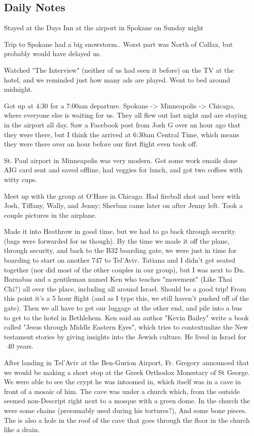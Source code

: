 \documentclass[letterpaper]{report}
\begin{document}
\clearpage
\subsection{Daily Notes}
Stayed at the Days Inn at the airport  in Spokane on Sunday night

Trip to Spokane had a big snowstorm.. Worst part was North of Colfax, but probably would have delayed us.

Watched "The Interview" (neither of us had seen it before) on the TV at the hotel, and we reminded just how many ads are played. Went to bed around midnight.

Got up at 4:30 for a 7:00am departure. Spokane -> Minneapolis -> Chicago, where everyone else is waiting for us. They all flew out last night and are staying in the airport all day. Saw a Facebook post from Josh G over an hour ago that they were there, but I think the arrived at 6:30am Central Time, which means they were there over an hour before our first flight even took off.

St. Paul airport in Minneapolis was very modern. Got some work emails done AIG card sent and saved offline, had veggies for lunch, and got two coffees with witty cups.

Meet up with the group at O'Hare in Chicago. Had fireball shot and beer with Josh, Tiffany, Wally, and Jenny; Sherban came later on after Jenny left. Took a couple pictures in the airplane.

Made it into Heathrow in good time, but we had to go back through security.  (bags were forwarded for us though).
By the time we made it off the plane, through security, and back to the B32 boarding gate, we were just in time for boarding to start on another 747 to Tel'Aviv.  Tatiana and I didn't get seated together (nor did most of the other couples in our group), but I was next to Dn. Barnabas and a gentileman named Ken who teaches "movement" (Like Thai Chi?) all over the place, including all around Israel. Should be a good trip!   From this point it's a 5 hour flight (and as I type this, we still haven't pushed off of the gate).  Then we all have to get our luggage at the other end, and pile into a bus to get to the hotel in Bethlehem.
Ken said an author "Kevin Bailey" write a book called "Jesus through Middle Eastern Eyes", which tries to contextualize the New testament stories by giving insights into the Jewish culture. He lived in Israel for ~40 years.

After landing in Tel'Aviv at the Ben-Gurion Airport, Fr. Gregory announced that we would be making a short stop at the Greek Orthodox Monestary of St George. We were able to see the crypt he was intoomed in, which itself was in a cave in front of a mosaic of him. The cave was under a church which, from the outside seemed non-Descript right next to a mosque with a green dome. In the church the were some chains (presumably used during his tortures?), And some bone pieces. The is also a hole in the roof of the cave that goes through the floor in the church like a drain.
\end{document}
